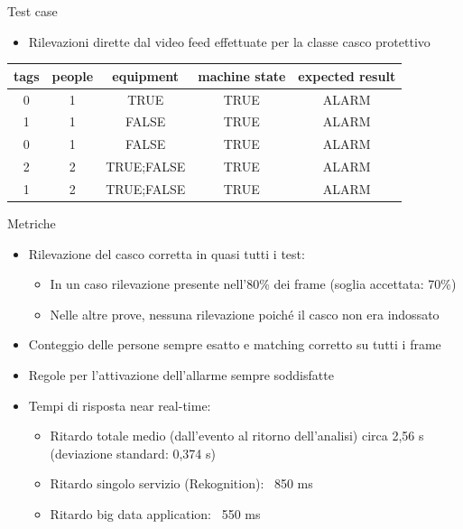 \documentclass{beamer}
\begin{document}
\begin{frame}{Test case}

\begin{itemize}
    \item Rilevazioni dirette dal video feed effettuate per la classe casco protettivo
\end{itemize}
\vspace{0.5cm}

\begin{table}[h]
\centering
\begin{tabular}{c c c c c}
\hline
\textbf{tags} & \textbf{people} & \textbf{equipment} & \textbf{machine state} & \textbf{expected result} \\
\hline
0 & 1 & TRUE & TRUE & ALARM \\
1 & 1 & FALSE & TRUE & ALARM \\
0 & 1 & FALSE & TRUE & ALARM \\
2 & 2 & TRUE;FALSE & TRUE & ALARM \\
1 & 2 & TRUE;FALSE & TRUE & ALARM \\
\hline
\end{tabular}
\end{table}

\end{frame}


\begin{frame}{Metriche}
\begin{itemize}
    \item Rilevazione del casco corretta in quasi tutti i test:
        \begin{itemize}
            \item In un caso rilevazione presente nell’80\% dei frame (soglia accettata: 70\%)
            \item Nelle altre prove, nessuna rilevazione poiché il casco non era indossato
        \end{itemize}
    \item Conteggio delle persone sempre esatto e matching corretto su tutti i frame
    \item Regole per l’attivazione dell’allarme sempre soddisfatte
    \item Tempi di risposta near real-time:
        \begin{itemize}
            \item Ritardo totale medio (dall’evento al ritorno dell’analisi) circa 2,56 s (deviazione standard: 0,374 s)
            \item Ritardo singolo servizio (Rekognition): ~850 ms
            \item Ritardo big data application: ~550 ms
        \end{itemize}
\end{itemize}
\end{frame}
\end{document}

